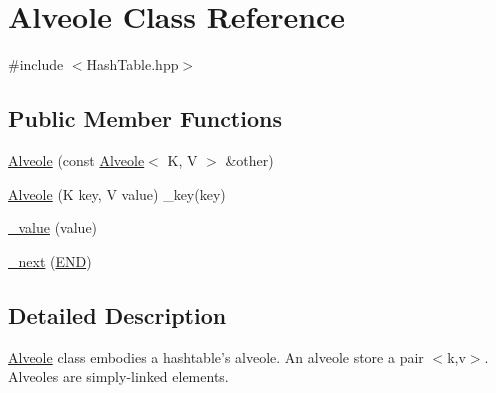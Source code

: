 \hypertarget{class_alveole}{\section{Alveole Class Reference}
\label{class_alveole}
}


{\ttfamily \#include $<$Hash\-Table.\-hpp$>$}

\subsection*{Public Member Functions}
\begin{DoxyCompactItemize}
\item 
\hyperlink{class_alveole_a3ebfa3f42acae6ad928e8168114b3965}{Alveole} (const \hyperlink{class_alveole}{Alveole}$<$ K, V $>$ \&other)
\item 
\hyperlink{class_alveole_a9e4aecc9d0671a5887bb11ed3aadfb8c}{Alveole} (K key, V value) \-\_\-key(key)
\item 
\hyperlink{class_alveole_a2e5ad3e79a9cabaee646590a7568c519}{\-\_\-value} (value)
\item 
\hyperlink{class_alveole_a6e9f9d96861447f8406314dad1746176}{\-\_\-next} (\hyperlink{_hash_table_8hpp_a29fd18bed01c4d836c7ebfe73a125c3f}{E\-N\-D})
\end{DoxyCompactItemize}


\subsection{Detailed Description}
\hyperlink{class_alveole}{Alveole} class embodies a hashtable's alveole. An alveole store a pair $<$k,v$>$. Alveoles are simply-\/linked elements. 

